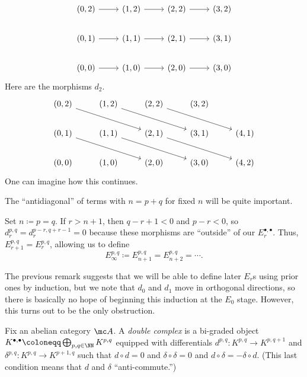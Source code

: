 \documentclass[../notes.tex]{subfiles}
\begin{document}
\[\begin{tikzcd}
	{(0,2)} & {(1,2)} & {(2,2)} & {(3,2)} \\
	{(0,1)} & {(1,1)} & {(2,1)} & {(3,1)} \\
	{(0,0)} & {(1,0)} & {(2,0)} & {(3,0)}
	\arrow[from=1-1, to=1-2]
	\arrow[from=1-2, to=1-3]
	\arrow[from=1-3, to=1-4]
	\arrow[from=2-1, to=2-2]
	\arrow[from=2-2, to=2-3]
	\arrow[from=2-3, to=2-4]
	\arrow[from=3-1, to=3-2]
	\arrow[from=3-2, to=3-3]
	\arrow[from=3-3, to=3-4]
\end{tikzcd}\]
Here are the morphisms $d_2$.
\[\begin{tikzcd}
	{(0,2)} & {(1,2)} & {(2,2)} & {(3,2)} \\
	{(0,1)} & {(1,1)} & {(2,1)} & {(3,1)} & {(4,1)} \\
	{(0,0)} & {(1,0)} & {(2,0)} & {(3,0)} & {(4,2)}
	\arrow[from=1-1, to=2-3]
	\arrow[from=1-2, to=2-4]
	\arrow[from=1-3, to=2-5]
	\arrow[from=2-1, to=3-3]
	\arrow[from=2-2, to=3-4]
	\arrow[from=2-3, to=3-5]
\end{tikzcd}\]
One can imagine how this continues.
\begin{remark}
	The ``antidiagonal'' of terms with $n=p+q$ for fixed $n$ will be quite important.
\end{remark}
\begin{remark}
	Set $n\coloneqq p=q$. If $r>n+1$, then $q-r+1<0$ and $p-r<0$, so $d_r^{p,q}=d_r^{p-r,q+r-1}=0$ because these morphisms are ``outside'' of our $E_r^{\bullet,\bullet}$. Thus, $E_{r+1}^{p,q}=E_r^{p,q}$, allowing us to define
	\[E_\infty^{p,q}\coloneqq E_{n+1}^{p,q}=E_{n+2}^{p,q}=\cdots.\]
\end{remark}
The previous remark suggests that we will be able to define later $E_r$s using prior ones by induction, but we note that $d_0$ and $d_1$ move in orthogonal directions, so there is basically no hope of beginning this induction at the $E_0$ stage. However, this turns out to be the only obstruction.
\begin{definition}
	Fix an abelian category $\mc A$. A \textit{double complex} is a bi-graded object $K^{\bullet,\bullet}\coloneqq\bigoplus_{p,q\in\NN}K^{p,q}$ equipped with differentials $d^{p,q}\colon K^{p,q}\to K^{p,q+1}$ and $\delta^{p,q}\colon K^{p,q}\to K^{p+1,q}$ such that $d\circ d=0$ and $\delta\circ\delta=0$ and $d\circ\delta=-\delta\circ d$. (This last condition means that $d$ and $\delta$ ``anti-commute.'')
\end{definition}
\end{document}
